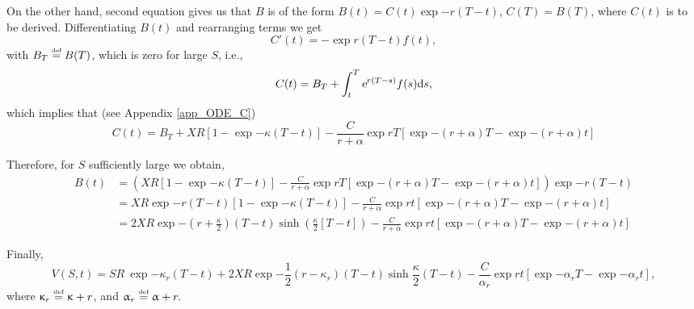 On the other hand, second equation gives us that $B$ is of the form $B(t) = C(t) \exp{-r (T-t)}$, $C(T) = B(T)$, where $C(t)$ is to be derived. Differentiating $B(t)$ and rearranging terms we get
	\begin{equation}\label{C_ode}
		C'(t) = - \exp{r(T-t)}f(t), 
	\end{equation}
with $  B_T \overset{\text{\tiny def}}{=} B(T) $, which is zero for large $S$, i.e.,
	\begin{equation}\label{C_ode_sol}
		 C(t) 	= B_T + \int_t^T \text{\sl e}^{r(T-s)}f(s)\text{\rm d} s,
	\end{equation}
which implies that (see Appendix \ref{app_ODE_C})
	\begin{equation}
		C(t) = B_T + {X R}  \left[1 -  \exp{-\kappa(T-t)}\right]- \frac{C}{r+\alpha}\exp{rT}\left[\exp{-(r+\alpha)T}-\exp{-(r+\alpha)t}\right]
	\end{equation}

Therefore, for $S$ sufficiently large we obtain,
	\begin{equation}
		\begin{aligned}
			B(t) 	&= \left({X R}  \left[1 -  \exp{-\kappa(T-t)}\right]- \frac{C}{r+\alpha}\exp{rT}\left[\exp{-(r+\alpha)T}-\exp{-(r+\alpha)t}\right]\right) \exp{-r(T-t)}\\
					&= {X R\exp{-r(T-t)}} \left[1 -  \exp{- \kappa (T-t)}\right]- \frac{C}{r+\alpha}\exp{rt}\left[\exp{-(r+\alpha)T}-\exp{-(r+\alpha)t}\right]\\
					&= {2X R}\exp{-\left(r+\frac{\kappa}{2}\right)(T-t)}\sinh\left(\frac{\kappa}{2}[T-t]\right)- \frac{C}{r+\alpha}\exp{rt}\left[\exp{-(r+\alpha)T}-\exp{-(r+\alpha)t}\right]
		\end{aligned}
	\end{equation}

Finally,
	\begin{equation}\label{boundary_formula}
		V(S,t) = SR  \ \exp{-\kappa_r(T-t)} +  {2X R}\exp{-\frac{1}{2}\left(r-\kappa_r\right)(T-t)}\sinh \frac{\kappa}{2}(T-t)- \frac{C}{\alpha_r}\exp{rt}\left[\exp{-\alpha_r T}-\exp{-\alpha_r t}\right],
	\end{equation}
	where $\upkappa_r \overset{\text{\tiny def}}{=} \upkappa + r$, and $\upalpha_r \overset{\text{\tiny def}}{=}  \upalpha + r.$
